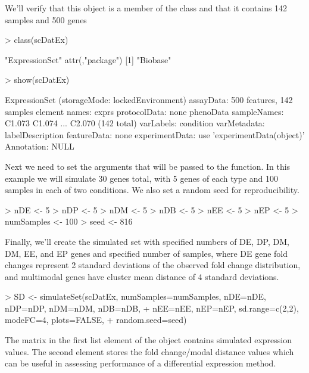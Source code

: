 \documentclass{article}
\begin{document}
We'll verify that this object is a member of the  class and that it contains 142 samples and 500 genes
\begin{Schunk}
\begin{Sinput}
> class(scDatEx)
\end{Sinput}
\begin{Soutput}
[1] "ExpressionSet"
attr(,"package")
[1] "Biobase"
\end{Soutput}
\begin{Sinput}
> show(scDatEx)
\end{Sinput}
\begin{Soutput}
ExpressionSet (storageMode: lockedEnvironment)
assayData: 500 features, 142 samples 
  element names: exprs 
protocolData: none
phenoData
  sampleNames: C1.073 C1.074 ... C2.070 (142 total)
  varLabels: condition
  varMetadata: labelDescription
featureData: none
experimentData: use 'experimentData(object)'
Annotation:  
NULL
\end{Soutput}
\end{Schunk}

Next we need to set the arguments that will be passed to the  function.  In this example we will simulate 30 genes total, with 5 genes of each type and 100 samples in each of two conditions.  We also set a random seed for reproducibility.

\begin{Schunk}
\begin{Sinput}
> nDE <- 5
> nDP <- 5
> nDM <- 5
> nDB <- 5
> nEE <- 5
> nEP <- 5
> numSamples <- 100
> seed <- 816
\end{Sinput}
\end{Schunk}

Finally, we'll create the simulated set with specified numbers of DE, DP, DM, DM, EE, and EP genes and specified number of samples, where DE gene fold changes represent 2 standard deviations of the observed fold change distribution, and multimodal genes have cluster mean distance of 4 standard deviations.
\begin{Schunk}
\begin{Sinput}
> SD <- simulateSet(scDatEx, numSamples=numSamples, nDE=nDE, nDP=nDP, nDM=nDM, nDB=nDB, 
+                   nEE=nEE, nEP=nEP, sd.range=c(2,2), modeFC=4, plots=FALSE, 
+                   random.seed=seed)
\end{Sinput}
\end{Schunk}

The matrix in the first list element of the  object contains simulated expression values.  The second element stores the fold change/modal distance values which can be useful in assessing performance of a differential expression method.
\end{document}
